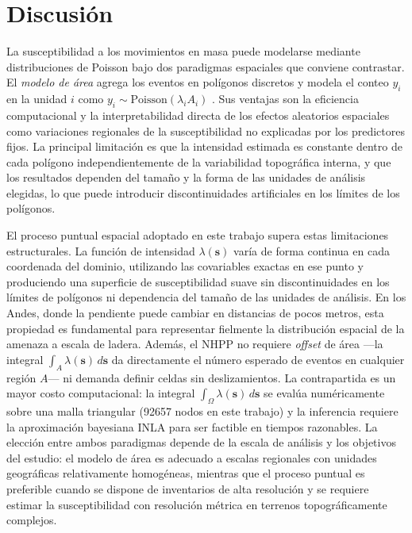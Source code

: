 \documentclass[10pt, twocolumn, letterpaper]{article}
\begin{document}
\section{Discusión}
\label{sec:discussion}

La susceptibilidad a los movimientos en masa puede modelarse mediante
distribuciones de Poisson bajo dos paradigmas espaciales que conviene
contrastar. El \emph{modelo de área} agrega los eventos en polígonos discretos
y modela el conteo $y_i$
en la unidad $i$ como $y_i \sim \text{Poisson}(\lambda_i A_i)$
\cite{aristizabal2025ag}. Sus ventajas son la eficiencia
computacional y la interpretabilidad directa de los efectos aleatorios espaciales como variaciones
regionales de la susceptibilidad no explicadas por los predictores fijos. La
principal limitación es que la intensidad estimada es constante dentro de cada
polígono independientemente de la variabilidad topográfica interna, y que los
resultados dependen del tamaño y la forma de las unidades de análisis elegidas,
lo que puede introducir discontinuidades artificiales en los límites de los
polígonos.

El proceso puntual espacial adoptado en este trabajo supera estas limitaciones
estructurales. La función de intensidad $\lambda(\mathbf{s})$ varía de forma
continua en cada coordenada del dominio, utilizando las covariables exactas en
ese punto y produciendo una superficie de susceptibilidad suave sin
discontinuidades en los límites de polígonos ni dependencia del tamaño de las
unidades de análisis. En los Andes, donde la pendiente puede cambiar en
distancias de pocos metros, esta propiedad es fundamental para representar
fielmente la distribución espacial de la amenaza a escala de ladera. Además, el
NHPP no requiere \emph{offset} de área ---la integral
$\int_A \lambda(\mathbf{s})\,d\mathbf{s}$ da directamente el número esperado
de eventos en cualquier región $A$--- ni demanda definir celdas sin
deslizamientos. La contrapartida es un mayor costo computacional: la integral
$\int_\Omega \lambda(\mathbf{s})\,d\mathbf{s}$ se evalúa numéricamente sobre
una malla triangular (\num{92657} nodos en este trabajo) y la inferencia
requiere la aproximación bayesiana INLA para ser factible en tiempos razonables.
La elección entre ambos paradigmas depende de la escala de análisis y los
objetivos del estudio: el modelo de área es adecuado a escalas regionales con
unidades geográficas relativamente homogéneas, mientras que el proceso puntual
es preferible cuando se dispone de inventarios de alta resolución y se requiere
estimar la susceptibilidad con resolución métrica en terrenos topográficamente
complejos.
\end{document}
